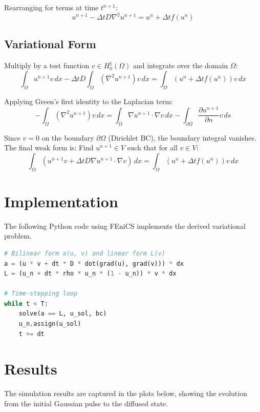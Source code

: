 \documentclass[a4paper,12pt]{article}
\begin{document}
Rearranging for terms at time $t^{n+1}$:
\begin{equation}
    u^{n+1} - \Delta t D \nabla^2 u^{n+1} = u^n + \Delta t f(u^n)
\end{equation}

\subsection{Variational Form}
Multiply by a test function $v \in H_0^1(\Omega)$ and integrate over the domain $\Omega$:
\begin{equation}
    \int_\Omega u^{n+1} v \, dx - \Delta t D \int_\Omega (\nabla^2 u^{n+1}) v \, dx = \int_\Omega (u^n + \Delta t f(u^n)) v \, dx
\end{equation}

Applying Green's first identity to the Laplacian term:
\begin{equation}
    -\int_\Omega (\nabla^2 u^{n+1}) v \, dx = \int_\Omega \nabla u^{n+1} \cdot \nabla v \, dx - \int_{\partial \Omega} \frac{\partial u^{n+1}}{\partial n} v \, ds
\end{equation}

Since $v = 0$ on the boundary $\partial\Omega$ (Dirichlet BC), the boundary integral vanishes. The final weak form is: Find $u^{n+1} \in V$ such that for all $v \in V$:
\begin{equation}
    \int_\Omega (u^{n+1} v + \Delta t D \nabla u^{n+1} \cdot \nabla v) \, dx = \int_\Omega (u^n + \Delta t f(u^n)) v \, dx
\end{equation}

\section{Implementation}
The following Python code using FEniCS implements the derived variational problem.

\begin{lstlisting}[language=Python, caption=FEniCS Implementation]
# Bilinear form a(u, v) and linear form L(v)
a = (u * v + dt * D * dot(grad(u), grad(v))) * dx
L = (u_n + dt * rho * u_n * (1 - u_n)) * v * dx

# Time-stepping loop
while t < T:
    solve(a == L, u_sol, bc)
    u_n.assign(u_sol)
    t += dt
\end{lstlisting}

\section{Results}
The simulation results are captured in the plots below, showing the evolution from the initial Gaussian pulse to the diffused state.
\end{document}
